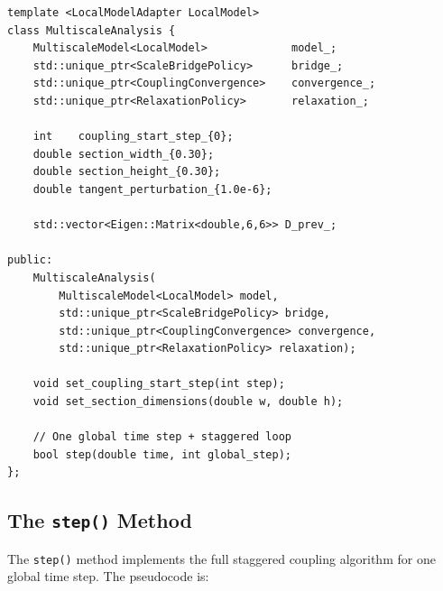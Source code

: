 \begin{lstlisting}[caption={\texttt{MultiscaleAnalysis} class (abridged).},
                   label={lst:multiscale-analysis}]
template <LocalModelAdapter LocalModel>
class MultiscaleAnalysis {
    MultiscaleModel<LocalModel>             model_;
    std::unique_ptr<ScaleBridgePolicy>      bridge_;
    std::unique_ptr<CouplingConvergence>    convergence_;
    std::unique_ptr<RelaxationPolicy>       relaxation_;

    int    coupling_start_step_{0};
    double section_width_{0.30};
    double section_height_{0.30};
    double tangent_perturbation_{1.0e-6};

    std::vector<Eigen::Matrix<double,6,6>> D_prev_;

public:
    MultiscaleAnalysis(
        MultiscaleModel<LocalModel> model,
        std::unique_ptr<ScaleBridgePolicy> bridge,
        std::unique_ptr<CouplingConvergence> convergence,
        std::unique_ptr<RelaxationPolicy> relaxation);

    void set_coupling_start_step(int step);
    void set_section_dimensions(double w, double h);

    // One global time step + staggered loop
    bool step(double time, int global_step);
};
\end{lstlisting}

\subsection{The \texttt{step()} Method}
\label{sec:refactor-step-method}

The \texttt{step()} method implements the full staggered coupling
algorithm for one global time step.  The pseudocode is:

